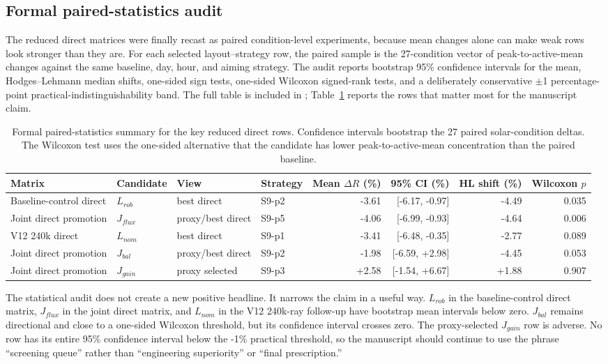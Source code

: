 \documentclass[final,3p,times]{elsarticle}
\begin{document}
\fi

\subsection{Formal paired-statistics audit}
The reduced direct matrices were finally recast as paired condition-level experiments, because mean changes alone can make weak rows look stronger than they are. For each selected layout--strategy row, the paired sample is the 27-condition vector of peak-to-active-mean changes against the same baseline, day, hour, and aiming strategy. The audit reports bootstrap 95\% confidence intervals for the mean, Hodges--Lehmann median shifts, one-sided sign tests, one-sided Wilcoxon signed-rank tests, and a deliberately conservative $\pm$1 percentage-point practical-indistinguishability band. The full table is included in ; Table~\ref{tab:formal-paired} reports the rows that matter most for the manuscript claim.

\begin{table}[t]
\centering
\caption{Formal paired-statistics summary for the key reduced direct rows. Confidence intervals bootstrap the 27 paired solar-condition deltas. The Wilcoxon test uses the one-sided alternative that the candidate has lower peak-to-active-mean concentration than the paired baseline.}
\label{tab:formal-paired}
\scriptsize
\begin{tabular*}{\textwidth}{@{\extracolsep{\fill}}llllrrrr@{}}
\toprule
Matrix & Candidate & View & Strategy & Mean $\Delta R$ (\%) & 95\% CI (\%) & HL shift (\%) & Wilcoxon $p$ \\
\midrule
Baseline-control direct & $L_{rob}$ & best direct & S9-p2 & -3.61 & [-6.17, -0.97] & -4.49 & 0.035 \\
Joint direct promotion & $J_{flux}$ & proxy/best direct & S9-p5 & -4.06 & [-6.99, -0.93] & -4.64 & 0.006 \\
V12 240k direct & $L_{nom}$ & best direct & S9-p1 & -3.41 & [-6.48, -0.35] & -2.77 & 0.089 \\
Joint direct promotion & $J_{bal}$ & proxy/best direct & S9-p2 & -1.98 & [-6.59, +2.98] & -4.45 & 0.053 \\
Joint direct promotion & $J_{gain}$ & proxy selected & S9-p3 & +2.58 & [-1.54, +6.67] & +1.88 & 0.907 \\
\bottomrule
\end{tabular*}
\end{table}

The statistical audit does not create a new positive headline. It narrows the claim in a useful way. $L_{rob}$ in the baseline-control direct matrix, $J_{flux}$ in the joint direct matrix, and $L_{nom}$ in the V12 240k-ray follow-up have bootstrap mean intervals below zero. $J_{bal}$ remains directional and close to a one-sided Wilcoxon threshold, but its confidence interval crosses zero. The proxy-selected $J_{gain}$ row is adverse. No row has its entire 95\% confidence interval below the -1\% practical threshold, so the manuscript should continue to use the phrase ``screening queue'' rather than ``engineering superiority'' or ``final prescription.''
\end{document}
